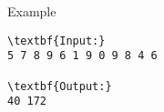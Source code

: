 Example
\begin{verbatim}
\textbf{Input:}
5 7 8 9 6 1 9 0 9 8 4 6

\textbf{Output:}
40 172

\end{verbatim}